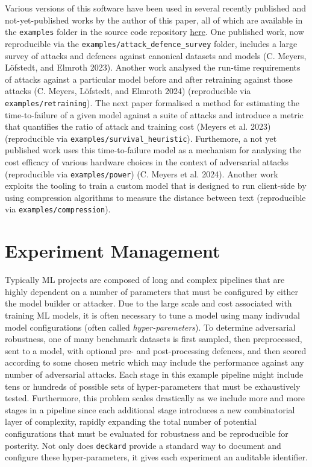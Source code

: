 \documentclass[
]{article}
\begin{document}
Various versions of this software have been used in several recently
published and not-yet-published works by the author of this paper, all
of which are available in the \texttt{examples} folder in the source
code repository
\href{https://github.com/simplymathematics/deckard}{here}. One published
work, now reproducible via the \texttt{examples/attack\_defence\_survey}
folder, includes a large survey of attacks and defences against
canonical datasets and models (C. Meyers, Löfstedt, and Elmroth 2023).
Another work analysed the run-time requirements of attacks against a
particular model before and after retraining against those attacks (C.
Meyers, Löfstedt, and Elmroth 2024) (reproducible via
\texttt{examples/retraining}). The next paper formalised a method for
estimating the time-to-failure of a given model against a suite of
attacks and introduce a metric that quantifies the ratio of attack and
training cost (Meyers et al. 2023) (reproducible via
\texttt{examples/survival\_heuristic}). Furthemore, a not yet published
work uses this time-to-failure model as a mechanism for analysing the
cost efficacy of various hardware choices in the context of adversarial
attacks (reproducible via \texttt{examples/power}) (C. Meyers et al.
2024). Another work exploits the tooling to train a custom model that is
designed to run client-side by using compression algorithms to measure
the distance between text (reproducible via
\texttt{examples/compression}).

\hypertarget{experiment-management}{%
\section{Experiment Management}\label{experiment-management}}

Typically ML projects are composed of long and complex pipelines that
are highly dependent on a number of parameters that must be configured
by either the model builder or attacker. Due to the large scale and cost
associated with training ML models, it is often necessary to tune a
model using many indivudal model configurations (often called
\emph{hyper-paremeters}). To determine adversarial robustness, one of
many benchmark datasets is first sampled, then preprocessed, sent to a
model, with optional pre- and post-processing defences, and then scored
according to some chosen metric which may include the performance
against any number of adversarial attacks. Each stage in this example
pipeline might include tens or hundreds of possible sets of
hyper-parameters that must be exhaustively tested. Furthermore, this
problem scales drastically as we include more and more stages in a
pipeline since each additional stage introduces a new combinatorial
layer of complexity, rapidly expanding the total number of potential
configurations that must be evaluated for robustness and be reproducible
for posterity. Not only does \texttt{deckard} provide a standard way to
document and configure these hyper-parameters, it gives each experiment
an auditable identifier.
\end{document}
